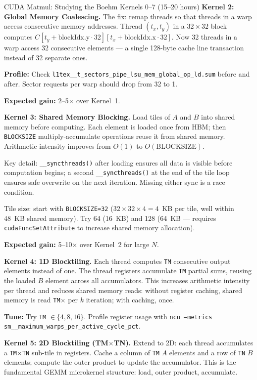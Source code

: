 \begin{exercise}{CUDA Matmul: Studying the Boehm Kernels 0--7 (15--20 hours)}
\medskip
\textbf{Kernel 2: Global Memory Coalescing.}
The fix: remap threads so that threads in a warp access consecutive memory addresses. Thread $(t_x, t_y)$ in a $32 \times 32$ block computes $C[t_y + \text{blockIdx.y} \cdot 32][t_x + \text{blockIdx.x} \cdot 32]$. Now 32 threads in a warp access 32 consecutive elements --- a single 128-byte cache line transaction instead of 32 separate ones.

\textbf{Profile:} Check \texttt{l1tex\_\_t\_sectors\_pipe\_lsu\_mem\_global\_op\_ld.sum} before and after. Sector requests per warp should drop from 32 to 1.

\textbf{Expected gain:} 2--5$\times$ over Kernel~1.

\medskip
\textbf{Kernel 3: Shared Memory Blocking.}
Load tiles of $A$ and $B$ into shared memory before computing. Each element is loaded once from HBM; then \texttt{BLOCKSIZE} multiply-accumulate operations reuse it from shared memory. Arithmetic intensity improves from $O(1)$ to $O(\text{BLOCKSIZE})$.

Key detail: \texttt{\_\_syncthreads()} after loading ensures all data is visible before computation begins; a second \texttt{\_\_syncthreads()} at the end of the tile loop ensures safe overwrite on the next iteration. Missing either sync is a race condition.

Tile size: start with \texttt{BLOCKSIZE=32} ($32 \times 32 \times 4 = 4$~KB per tile, well within 48~KB shared memory). Try 64 (16~KB) and 128 (64~KB --- requires \texttt{cudaFuncSetAttribute} to increase shared memory allocation).

\textbf{Expected gain:} 5--10$\times$ over Kernel~2 for large $N$.

\medskip
\textbf{Kernel 4: 1D Blocktiling.}
Each thread computes \texttt{TM} consecutive output elements instead of one. The thread registers accumulate \texttt{TM} partial sums, reusing the loaded $B$ element across all accumulators. This increases arithmetic intensity per thread and reduces shared memory reads: without register caching, shared memory is read \texttt{TM}$\times$ per $k$ iteration; with caching, once.

\textbf{Tune:} Try \texttt{TM} $\in \{4, 8, 16\}$. Profile register usage with \texttt{ncu --metrics sm\_\_maximum\_warps\_per\_active\_cycle\_pct}.

\medskip
\textbf{Kernel 5: 2D Blocktiling (TM$\times$TN).}
Extend to 2D: each thread accumulates a \texttt{TM}$\times$\texttt{TN} sub-tile in registers. Cache a column of \texttt{TM} $A$ elements and a row of \texttt{TN} $B$ elements; compute the outer product to update the accumulator. This is the fundamental GEMM microkernel structure: load, outer product, accumulate.


\end{exercise}
